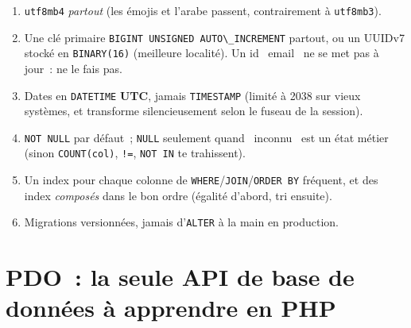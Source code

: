 \begin{enumerate}
  \item \verb|utf8mb4| \emph{partout} (les \'emojis et l'arabe passent, contrairement \`a \verb|utf8mb3|).
  \item Une cl\'e primaire \verb|BIGINT UNSIGNED AUTO\_INCREMENT| partout, ou un UUIDv7 stock\'e en
        \verb|BINARY(16)| (meilleure localit\'e). Un id \og ~email~ \fg{} ne se met pas \`a jour~: ne le fais pas.
  \item Dates en \verb|DATETIME| \textbf{UTC}, jamais \verb|TIMESTAMP| (limit\'e \`a 2038 sur vieux syst\`emes,
        et transforme silencieusement selon le fuseau de la session).
  \item \verb|NOT NULL| par d\'efaut~; \verb|NULL| seulement quand \og ~inconnu~ \fg{} est un \'etat m\'etier
        (sinon \verb|COUNT(col)|, \verb|!=|, \verb|NOT IN| te trahissent).
  \item Un index pour chaque colonne de \verb|WHERE|/\verb|JOIN|/\verb|ORDER BY| fr\'equent, et des
        index \emph{compos\'es} dans le bon ordre (\'egalit\'e d'abord, tri ensuite).
  \item Migrations versionn\'ees, jamais d'\verb|ALTER| \`a la main en production.
\end{enumerate}

\section{PDO~: la seule API de base de donn\'ees \`a apprendre en PHP}

